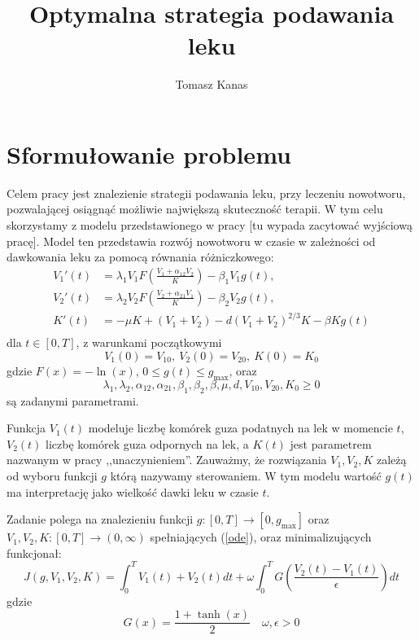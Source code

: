 \documentclass[11pt]{article}
\title{Optymalna strategia podawania leku}
\author{Tomasz Kanas}
\begin{document}
\maketitle

\section{Sformułowanie problemu}
Celem pracy jest znalezienie strategii podawania leku, przy leczeniu nowotworu, pozwalającej osiągnąć możliwie największą skuteczność terapii. W tym celu skorzystamy z modelu przedstawionego w pracy [tu wypada zacytować wyjściową pracę]. Model ten przedstawia rozwój nowotworu w czasie w zależności od dawkowania leku za pomocą równania różniczkowego:
\begin{equation} \label{ode}
  \begin{aligned} 
    V_1'(t) &= \lambda_1V_1F\left(\frac{V_1 + \alpha_{12}V_2}{K}\right) - \beta_1V_1g(t), \\
    V_2'(t) &= \lambda_2V_2F\left(\frac{V_2 + \alpha_{21}V_1}{K}\right) - \beta_2V_2g(t), \\
    K'(t) &= -\mu K + (V_1+V_2) - d{(V_1 + V_2)}^{2/3}K - \beta K g(t) \\
  \end{aligned}
\end{equation}
dla $t \in [0, T]$, z warunkami początkowymi
\begin{equation} \label{ode-start}
   V_1(0) = V_{10},\ V_2(0) = V_{20},\ K(0) = K_0
\end{equation}
gdzie $F(x) = -\ln(x)$, $ 0 \le g(t) \le g_{\max}$, oraz
\[\lambda_1, \lambda_2, \alpha_{12}, \alpha_{21}, \beta_1, \beta_2, \beta, \mu, d, V_{10}, V_{20}, K_0 \ge 0\]
są zadanymi parametrami.

Funkcja $V_1(t)$ modeluje liczbę komórek guza podatnych na lek w momencie $t$, $V_2(t)$ liczbę komórek guza odpornych na lek, a $K(t)$ jest parametrem nazwanym w pracy ,,unaczynieniem''. Zauważmy, że rozwiązania $V_1, V_2, K$ zależą od wyboru funkcji $g$ którą nazywamy sterowaniem. W tym modelu wartość $g(t)$ ma interpretację jako wielkość dawki leku w czasie $t$.

Zadanie polega na znalezieniu funkcji $g: [0, T] \to [0, g_{\max}]$ oraz $V_1, V_2, K: [0, T] \to (0, \infty)$ spełniających (\ref{ode}), oraz minimalizujących funkcjonał:
\begin{equation} \label{objf}
  J(g, V_1, V_2, K) = \int_0^T V_1(t) + V_2(t)dt + \omega\int_0^T G\left(\frac{V_2(t) - V_1(t)}{\epsilon}\right) dt
\end{equation}
gdzie
\begin{equation*}
  G(x) = \frac{1+\tanh(x)}{2} \quad
  \omega, \epsilon > 0 
\end{equation*}
\end{document}
